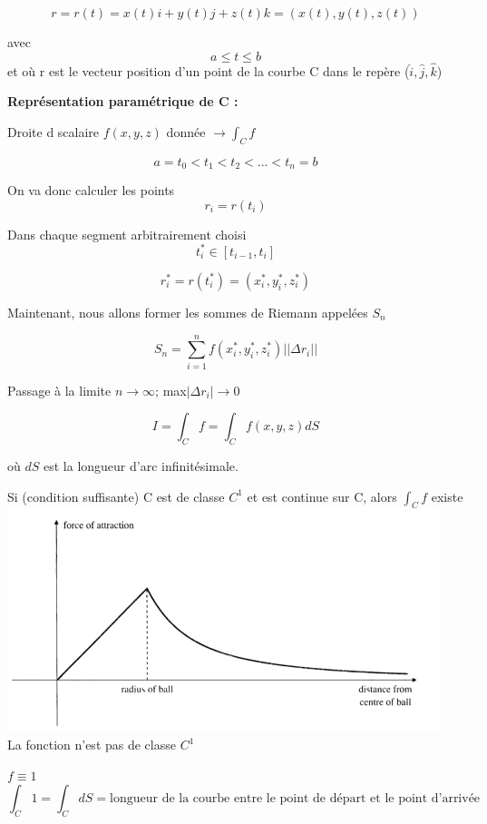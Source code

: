 \[r=r(t)=x(t)i+ y(t)j+z(t)k = (x(t),y(t),z(t))\]

avec \[a\leqslant t\leqslant b\] et où r est le vecteur position d'un point de la courbe C dans le repère (${\hat i,\hat{j}, \hat{k}}$)

\textbf{Représentation paramétrique de C :}

Droite d scalaire $f(x,y,z)$ donnée $\to \int_C f$

\[a=t_0<t_1<t_2<...<t_n=b\]

On va donc calculer les points
\[r_i = r(t_i)\]

Dans chaque segment arbitrairement choisi\[t_i^*\in[t_{i-1},t_i]\] 

\[r_i^*=r(t_i^*)=(x_i^*,y_i^*,z_i^*)\]

Maintenant, nous allons former les sommes de Riemann appelées $S_n$

\[S_n=\sum_{i=1}^nf(x_i^*,y_i^*,z_i^*)||\Delta r_i||\]

Passage à la limite $n\to\infty$; max$|\Delta r_i|\to 0$

\[I=\int_C f = \int_C f (x,y,z)dS\]

où $dS$ est la longueur d'arc infinitésimale.

\begin{mytheo}
Si (condition suffisante) C est de classe $C^1$ et est continue sur C, alors $\int_C f$ existe\\
\includegraphics[scale=0.5]{exemple1.png}\\
La fonction n'est pas de classe $C^1$
\end{mytheo}

\begin{myrem}

$f\equiv1$
\[\int_C 1 = \int_C dS = \text{longueur de la courbe entre le point de départ et le point d'arrivée}\]
\end{myrem}

